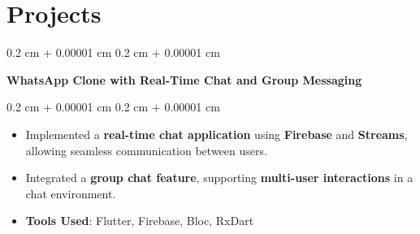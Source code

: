 \documentclass[10pt, letterpaper]{article}
\newenvironment{highlights}{
    \begin{itemize}[
        topsep=0.10 cm,
        parsep=0.10 cm,
        partopsep=0pt,
        itemsep=0pt,
        leftmargin=0.4 cm + 10pt
    ]
}{
    \end{itemize}
} %
\newenvironment{onecolentry}{
    \begin{adjustwidth}{
        0.2 cm + 0.00001 cm
    }{
        0.2 cm + 0.00001 cm
    }
}{
    \end{adjustwidth}
} %
\newenvironment{twocolentry}[2][]{
    \onecolentry
    \def\secondColumn{#2}
    \setcolumnwidth{\fill, 4.5 cm}
    \begin{paracol}{2}
}{
    \switchcolumn \raggedleft \secondColumn
    \end{paracol}
    \endonecolentry
} %
\let\hrefWithoutArrow\href
\renewcommand{\href}[2]{\hrefWithoutArrow{#1}{\ifthenelse{\equal{#2}{}}{ }{#2 }\raisebox{.15ex}{\footnotesize \faExternalLink*}}}
\begin{document}
    



        









    
    \section{Projects}
        
        \vspace{0.2 cm}

\begin{twocolentry}{
    \textit{\href{https://github.com/Aum-Patel1234/Flutter-Projects/tree/master/whatsapp_clone}{\color{black}{WhatsApp Clone}}}}
    \textbf{WhatsApp Clone with Real-Time Chat and Group Messaging}
\end{twocolentry}

\vspace{0.10 cm}
\begin{onecolentry}
    \begin{highlights}
        \item Implemented a \textbf{real-time chat application} using \textbf{Firebase} and \textbf{Streams}, allowing seamless communication between users.
        \item Integrated a \textbf{group chat feature}, supporting \textbf{multi-user interactions} in a chat environment.
        \item \textbf{Tools Used}: Flutter, Firebase, Bloc, RxDart
    \end{highlights}
\end{onecolentry}
\end{document}
